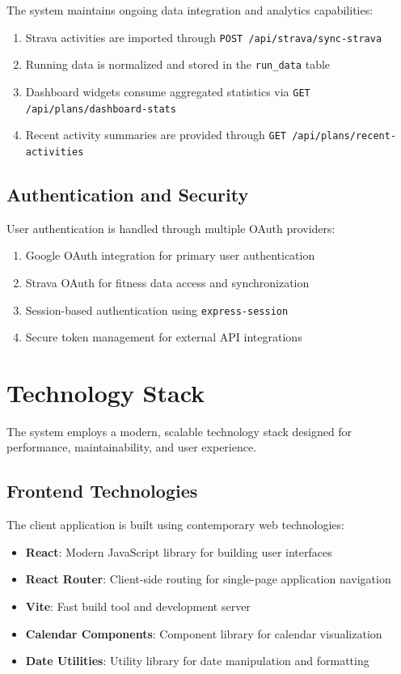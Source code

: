 The system maintains ongoing data integration and analytics capabilities:

\begin{enumerate}
    \item Strava activities are imported through \texttt{POST /api/strava/sync-strava}
    \item Running data is normalized and stored in the \texttt{run\_data} table
    \item Dashboard widgets consume aggregated statistics via \texttt{GET /api/plans/dashboard-stats}
    \item Recent activity summaries are provided through \texttt{GET /api/plans/recent-activities}
\end{enumerate}

\subsection{Authentication and Security}

User authentication is handled through multiple OAuth providers:

\begin{enumerate}
    \item Google OAuth integration for primary user authentication
    \item Strava OAuth for fitness data access and synchronization
    \item Session-based authentication using \texttt{express-session}
    \item Secure token management for external API integrations
\end{enumerate}

\section{Technology Stack}

The system employs a modern, scalable technology stack designed for performance, maintainability, and user experience.

\subsection{Frontend Technologies}

The client application is built using contemporary web technologies:

\begin{itemize}
    \item \textbf{React}: Modern JavaScript library for building user interfaces
    \item \textbf{React Router}: Client-side routing for single-page application navigation
    \item \textbf{Vite}: Fast build tool and development server
    \item \textbf{Calendar Components}: Component library for calendar visualization
    \item \textbf{Date Utilities}: Utility library for date manipulation and formatting
\end{itemize}

